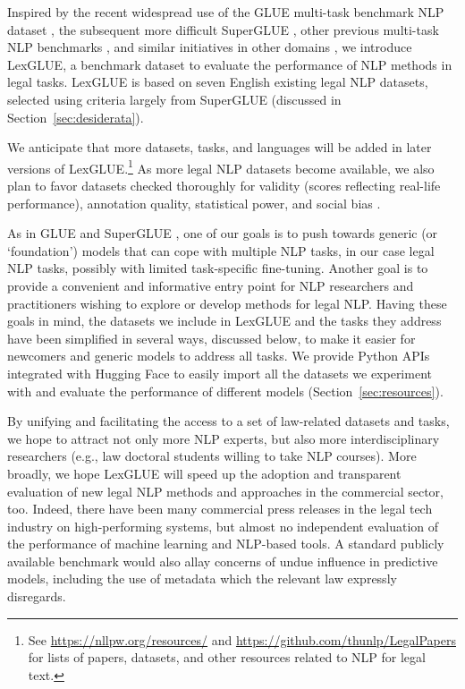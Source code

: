 \documentclass[11pt]{article}
\begin{document}
Inspired by the recent widespread use of the GLUE multi-task benchmark NLP dataset \cite{wang-2018-glue,wang-2019-glue}, the subsequent more difficult SuperGLUE \cite{wang-2019-superglue}, other previous multi-task NLP benchmarks \cite{conneau-kiela-2018-senteval,DecaNLP}, and similar initiatives in other domains \cite{peng2019transfer}, we introduce LexGLUE, a benchmark dataset to evaluate the performance of NLP methods in legal tasks. LexGLUE is based on seven English existing legal NLP datasets, selected using criteria largely from SuperGLUE (discussed in Section~\ref{sec:desiderata}).

We anticipate that more datasets, tasks, and languages will be added in later versions of LexGLUE.\footnote{See \url{https://nllpw.org/resources/} and \url{https://github.com/thunlp/LegalPapers} for lists of papers, datasets, and other resources related to NLP for legal text.} As more legal NLP datasets become available, we also plan to favor datasets checked thoroughly for validity (scores reflecting real-life performance), annotation quality, statistical power, and social bias \cite{bowman-dahl-2021}.

As in GLUE and SuperGLUE \cite{wang-2019-glue,wang-2019-superglue}, one of our goals is to push towards generic (or `foundation') models that can cope with multiple NLP tasks, in our case legal NLP tasks, possibly with limited task-specific fine-tuning.
Another goal is to provide a convenient and informative entry point for NLP researchers and practitioners wishing to explore or develop methods for legal NLP. Having these goals in mind, the datasets we include in LexGLUE and the tasks they address have been simplified in several ways, discussed below, to make it easier for newcomers and generic models to address all tasks.
We provide Python APIs integrated with Hugging Face \cite{wolf-etal-2020-transformers, lhoest2021datasets} to easily import all the datasets we experiment with and evaluate the performance of different models (Section~\ref{sec:resources}).

By unifying and facilitating the access to a set of law-related datasets and tasks, we hope to attract not only more NLP experts, but also more interdisciplinary researchers (e.g., law doctoral students willing to take NLP courses). 
More broadly, we hope LexGLUE will speed up the adoption and transparent evaluation of new legal NLP methods and approaches in the commercial sector, too.  Indeed, there have been many commercial press releases in the legal tech industry on high-performing systems, but almost no independent evaluation of the performance of machine learning and NLP-based tools. 
A standard publicly available benchmark would also allay concerns of undue influence in predictive models, including the use of metadata which the relevant law expressly disregards. 
\end{document}
